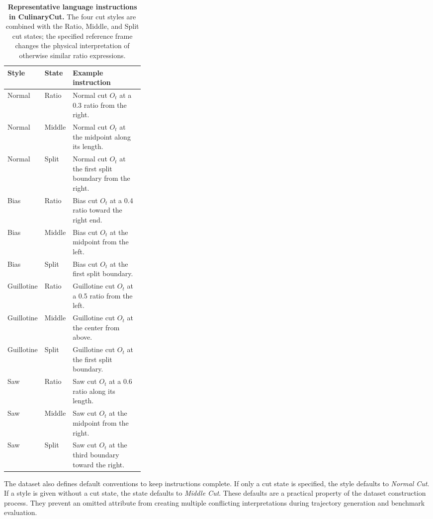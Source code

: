 \begin{table}[!htbp]
  \centering

  \caption{\textbf{Representative language instructions in CulinaryCut.} The four cut styles are combined with the Ratio, Middle, and Split cut states; the specified reference frame changes the physical interpretation of otherwise similar ratio expressions.}
  \label{tab:cut_language_examples}
    \begingroup
  \CutTableSetup
  \begin{tabularx}{\linewidth}{@{}>{\raggedright\arraybackslash}p{0.17\linewidth}>{\raggedright\arraybackslash}p{0.15\linewidth}X@{}}
    \toprule
    Style & State & Example instruction \\
    \midrule
    Normal & Ratio & Normal cut $O_t$ at a 0.3 ratio from the right. \\
    Normal & Middle & Normal cut $O_t$ at the midpoint along its length. \\
    Normal & Split & Normal cut $O_t$ at the first split boundary from the right. \\
    \midrule
    Bias & Ratio & Bias cut $O_t$ at a 0.4 ratio toward the right end. \\
    Bias & Middle & Bias cut $O_t$ at the midpoint from the left. \\
    Bias & Split & Bias cut $O_t$ at the first split boundary. \\
    \midrule
    Guillotine & Ratio & Guillotine cut $O_t$ at a 0.5 ratio from the left. \\
    Guillotine & Middle & Guillotine cut $O_t$ at the center from above. \\
    Guillotine & Split & Guillotine cut $O_t$ at the first split boundary. \\
    \midrule
    Saw & Ratio & Saw cut $O_t$ at a 0.6 ratio along its length. \\
    Saw & Middle & Saw cut $O_t$ at the midpoint from the right. \\
    Saw & Split & Saw cut $O_t$ at the third boundary toward the right. \\
    \bottomrule
  \end{tabularx}
  \endgroup
\end{table}

The dataset also defines default conventions to keep instructions complete. If only a cut state is specified, the style defaults to \emph{Normal Cut}. If a style is given without a cut state, the state defaults to \emph{Middle Cut}. These defaults are a practical property of the dataset construction process. They prevent an omitted attribute from creating multiple conflicting interpretations during trajectory generation and benchmark evaluation.

